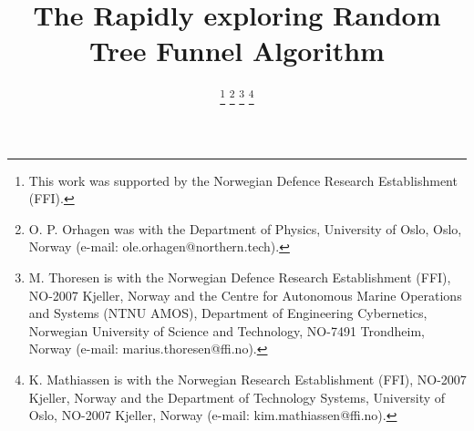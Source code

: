 \documentclass{IEEEtran}
\newcommand{\0}{\mathbf{0}}
\newcommand{\1}{\mathbf{1}}
\begin{document}
\title{The Rapidly exploring Random Tree Funnel Algorithm}

\author{

 \thanks{This work was supported by the Norwegian Defence Research Establishment (FFI).}
 \thanks{O. P. Orhagen was with the Department of Physics,
    University of Oslo, Oslo, Norway (e-mail: ole.orhagen@northern.tech). }
 \thanks{M. Thoresen is with
    the Norwegian Defence Research Establishment (FFI), NO-2007 Kjeller, Norway
    and the Centre for Autonomous Marine Operations and Systems (NTNU AMOS),
    Department of Engineering Cybernetics, Norwegian University of Science and Technology, NO-7491 Trondheim, Norway
    (e-mail: marius.thoresen@ffi.no).}
 \thanks{K. Mathiassen is with
    the Norwegian Research Establishment (FFI), NO-2007 Kjeller, Norway
    and the Department of Technology Systems, University of Oslo, NO-2007 Kjeller, Norway
    (e-mail: kim.mathiassen@ffi.no).}}

\maketitle
\end{document}
